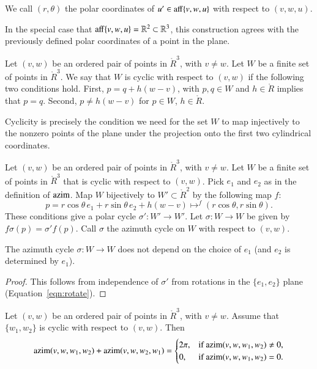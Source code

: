\begin{definition}\label{def:polar}
We call  $(r,\theta)$ the polar coordinates of $u'\in{\operatorname{aff}}\{v,w,u\}$ with
respect to $(v,w,u)$.
\end{definition}

In the special case that ${\operatorname{aff}}\{v,w,u\}=\mathbb{R}^2\subset \mathbb{R}^3$, this
construction agrees with the previously defined polar coordinates of a point in
the plane.

\begin{definition} Let $(v,w)$ be an ordered pair of points in
$\ring{R}^3$, with $v\ne w$.
Let $W$ be a finite set of points in $\ring{R}^3$.
We say that $W$ is cyclic with respect to $(v,w)$ if
the following two conditions hold.
First, $p = q + h (w-v)$, with $p,q\in W$ and $h\in \ring{R}$
implies that $p=q$.  Second, 
  $p\ne h(w-v)$ for $p\in W$, $h\in\ring{R}$.
\end{definition}

Cyclicity is precisely the condition we need for the
set $W$ to map injectively to the nonzero points of the 
plane under the projection
onto the first two cylindrical coordinates.

\begin{definition}
Let $(v,w)$ be an ordered pair of points in
$\ring{R}^3$, with $v\ne w$.
Let $W$ be a finite set of points in $\ring{R}^3$ that is
cyclic  with respect to $(v,w)$.
Pick $e_1$ and $e_2$ as in the definition
of ${\operatorname{azim}}$.  Map 
$W$ bijectively to $W'\subset\ring{R}^2$ by the following map $f$:
   $$p =  r\cos\theta\, e_1 + r\sin\theta\, e_2 + h (w-v) \mapsto^f
     (r\cos\theta,r\sin\theta).$$
These conditions give a polar cycle $\sigma':W'\to W'$.  Let
$\sigma:W\to W$ be given by $f\sigma(p) =\sigma'f(p)$.
Call $\sigma$ the azimuth cycle
on $W$ with respect to $(v,w)$.
\end{definition}

\begin{lemma} The azimuth cycle $\sigma:W\to W$ does not depend
on the choice of $e_1$ (and $e_2$ is determined by $e_1$).
\end{lemma}

\begin{proof} This follows from independence of $\sigma'$ from
rotations in the $\{e_1,e_2\}$ plane  (Equation~\ref{eqn:rotate}).
\end{proof}


\begin{lemma} Let $(v,w)$ be an ordered pair of points in $\ring{R}^3$,
with $v\ne w$.  Assume that $\{w_1,w_2\}$ is cyclic
with respect to $(v,w)$.  Then
  $$
  {\operatorname{azim}}(v,w,w_1,w_2) + {\operatorname{azim}}(v,w,w_2,w_1) 
  = \begin{cases} 2\pi, & \text{if }{\operatorname{azim}}(v,w,w_1,w_2)\ne 0,\\
    0, & \text{if }{\operatorname{azim}}(v,w,w_1,w_2)=0.
    \end{cases}
    $$
\end{lemma}

